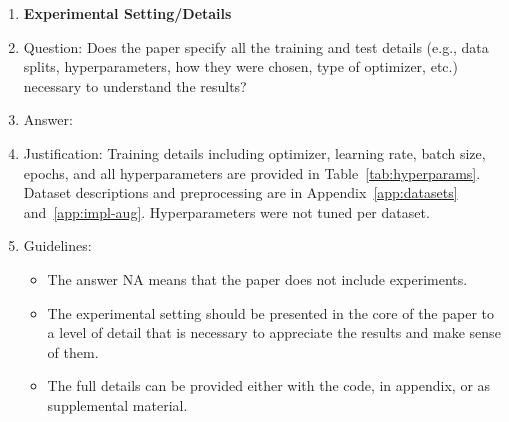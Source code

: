 \documentclass{article}
\theoremstyle{plain}
\theoremstyle{definition}
\begin{document}
\begin{enumerate}
  \item {\bf Experimental Setting/Details}
  \item[] Question: Does the paper specify all the training and test details (e.g., data splits, hyperparameters, how they were chosen, type of optimizer, etc.) necessary to understand the results?
  \item[] Answer: \answerYes{}
  \item[] Justification: Training details including optimizer, learning rate, batch size, epochs, and all hyperparameters are provided in Table~\ref{tab:hyperparams}. Dataset descriptions and preprocessing are in Appendix~\ref{app:datasets} and~\ref{app:impl-aug}. Hyperparameters were not tuned per dataset.
  \item[] Guidelines:
    \begin{itemize}
      \item The answer NA means that the paper does not include experiments.
      \item The experimental setting should be presented in the core of the paper to a level of detail that is necessary to appreciate the results and make sense of them.
      \item The full details can be provided either with the code, in appendix, or as supplemental material.
    \end{itemize}


\end{enumerate}
\end{document}
